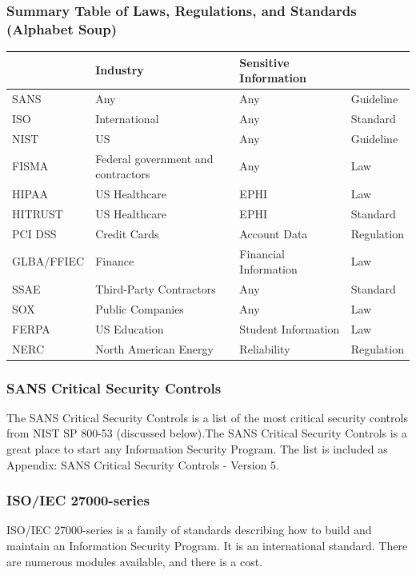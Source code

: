 \subsubsection{Summary Table of Laws, Regulations, and Standards (Alphabet Soup)}
\begin{table}[ht]\begin{center}\begin{tabular}{ | p{2.5cm} | p{3.5cm} | p{4.5cm} | p{2cm} |}\hline
 & Industry & Sensitive Information & \\\hline
SANS & Any & Any & Guideline\\\hline
ISO & International & Any & Standard\\\hline
NIST & US & Any & Guideline\\\hline
FISMA & Federal government and contractors & Any & Law\\\hline
HIPAA & US Healthcare & EPHI & Law\\\hline
HITRUST & US Healthcare & EPHI & Standard\\\hline
PCI DSS & Credit Cards & Account Data & Regulation\\\hline
GLBA/FFIEC & Finance & Financial Information & Law\\\hline
SSAE & Third-Party Contractors & Any & Standard\\\hline
SOX & Public Companies & Any & Law\\\hline
FERPA & US Education & Student Information & Law\\\hline
NERC & North American Energy & Reliability & Regulation\\\hline
\end{tabular}\end{center}\end{table}
\subsubsection{SANS Critical Security Controls}
The SANS Critical Security Controls is a list of the most critical security controls from NIST SP 800-53 (discussed below).The SANS Critical Security Controls is a great place to start any Information Security Program. The list is included as Appendix: SANS Critical Security Controls - Version 5.
\subsubsection{ISO/IEC 27000-series}
ISO/IEC 27000-series is a family of standards describing how to build and maintain an Information Security Program. It is an international standard. There are numerous modules available, and there is a cost.
